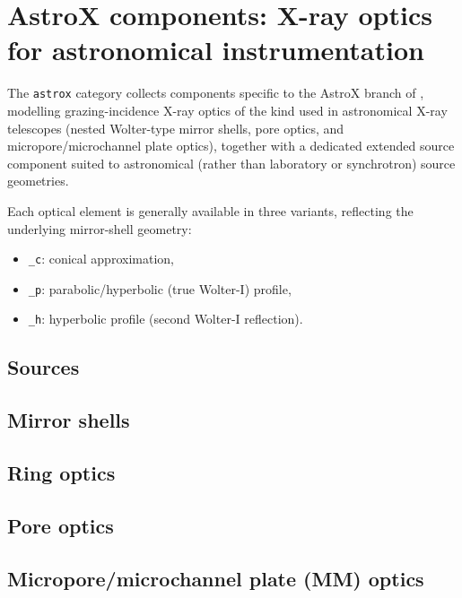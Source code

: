 
\chapter{AstroX components: X-ray optics for astronomical instrumentation}
\label{c:astrox}

The \texttt{astrox} category collects components specific to the AstroX
branch of \MCX, modelling grazing-incidence X-ray optics of the kind used
in astronomical X-ray telescopes (nested Wolter-type mirror shells, pore
optics, and micropore/microchannel plate optics), together with a
dedicated extended source component suited to astronomical (rather than
laboratory or synchrotron) source geometries.

Each optical element is generally available in three variants, reflecting
the underlying mirror-shell geometry:
\begin{itemize}
\item \texttt{\_c}: conical approximation,
\item \texttt{\_p}: parabolic/hyperbolic (true Wolter-I) profile,
\item \texttt{\_h}: hyperbolic profile (second Wolter-I reflection).
\end{itemize}

\section{Sources}


\section{Mirror shells}




\section{Ring optics}




\section{Pore optics}




\section{Micropore/microchannel plate (MM) optics}



